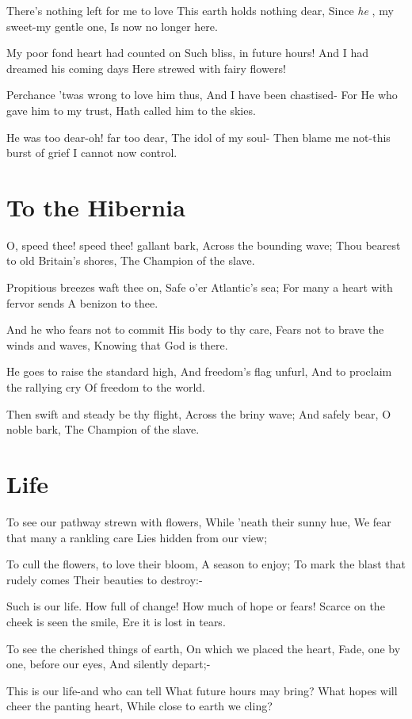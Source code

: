 \documentclass[11pt,a4paper]{article}
\begin{document}
There's nothing left for me to love
This earth holds nothing dear,
Since \textit{he} , my sweet-my gentle one,
Is now no longer here.

My poor fond heart had counted on
Such bliss, in future hours!
And I had dreamed his coming days
Here strewed with fairy flowers!

Perchance 'twas wrong to love him thus,
And I have been chastised-
For He who gave him to my trust,
Hath called him to the skies.

He was too dear-oh! far too dear,
The idol of my soul-
Then blame me not-this burst of grief
I cannot now control.

\section{To the Hibernia}

O, speed thee! speed thee! gallant bark,
Across the bounding wave;
Thou bearest to old Britain's shores,
The Champion of the slave.

Propitious breezes waft thee on,
Safe o'er Atlantic's sea;
For many a heart with fervor sends
A benizon to thee.

And he who fears not to commit
His body to thy care,
Fears not to brave the winds and waves,
Knowing that God is there.

He goes to raise the standard high,
And freedom's flag unfurl,
And to proclaim the rallying cry
Of freedom to the world.

Then swift and steady be thy flight,
Across the briny wave;
And safely bear, O noble bark,
The Champion of the slave.

\section{Life}

To see our pathway strewn with flowers,
While 'neath their sunny hue,
We fear that many a rankling care
Lies hidden from our view;

To cull the flowers, to love their bloom,
A season to enjoy;
To mark the blast that rudely comes
Their beauties to destroy:-

Such is our life. How full of change!
How much of hope or fears!
Scarce on the cheek is seen the smile,
Ere it is lost in tears.

To see the cherished things of earth,
On which we placed the heart,
Fade, one by one, before our eyes,
And silently depart;-

This is our life-and who can tell
What future hours may bring?
What hopes will cheer the panting heart,
While close to earth we cling?
\end{document}
